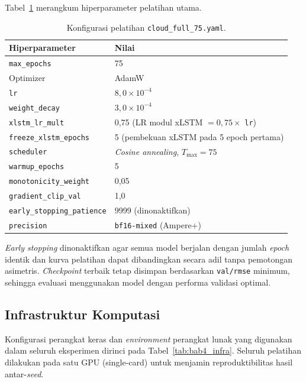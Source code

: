 Tabel~\ref{tab:bab4_training} merangkum hiperparameter pelatihan utama.

\begin{table}[ht]
\centering
\caption{Konfigurasi pelatihan \texttt{cloud\_full\_75.yaml}.}
\label{tab:bab4_training}
\small
\begin{tabular}{@{}ll@{}}
\toprule
\textbf{Hiperparameter} & \textbf{Nilai} \\
\midrule
\texttt{max\_epochs}            & 75 \\
Optimizer                       & AdamW \\
\texttt{lr}                     & $8{,}0 \times 10^{-4}$ \\
\texttt{weight\_decay}          & $3{,}0 \times 10^{-4}$ \\
\texttt{xlstm\_lr\_mult}        & 0{,}75 (LR modul xLSTM $= 0{,}75 \times$ \texttt{lr}) \\
\texttt{freeze\_xlstm\_epochs}  & 5 (pembekuan xLSTM pada 5 epoch pertama) \\
\texttt{scheduler}              & \emph{Cosine annealing}, $T_{\text{max}} = 75$ \\
\texttt{warmup\_epochs}         & 5 \\
\texttt{monotonicity\_weight}   & 0{,}05 \\
\texttt{gradient\_clip\_val}    & 1{,}0 \\
\texttt{early\_stopping\_patience} & 9999 (dinonaktifkan) \\
\texttt{precision}              & \texttt{bf16-mixed} (Ampere+) \\
\bottomrule
\end{tabular}
\end{table}

\emph{Early stopping} dinonaktifkan agar semua model berjalan dengan
jumlah \emph{epoch} identik dan kurva pelatihan dapat dibandingkan
secara adil tanpa pemotongan asimetris.
\emph{Checkpoint} terbaik tetap disimpan berdasarkan \texttt{val/rmse}
minimum, sehingga evaluasi menggunakan model dengan performa validasi
optimal.

\subsection{Infrastruktur Komputasi}
\label{subsec:bab4_infra}

Konfigurasi perangkat keras dan \emph{environment} perangkat lunak yang
digunakan dalam seluruh eksperimen dirinci pada Tabel~\ref{tab:bab4_infra}.
Seluruh pelatihan dilakukan pada satu GPU (single-card) untuk menjamin
reproduktibilitas hasil antar-\emph{seed}.


